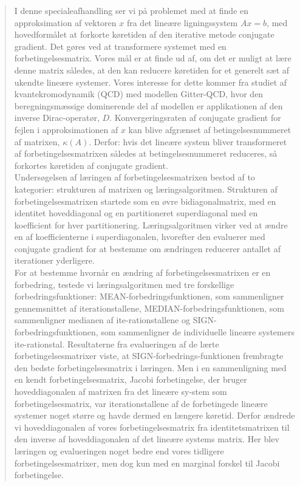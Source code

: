 \clearpage
\thispagestyle{empty}
\begin{abstract}
I denne specialeafhandling ser vi på problemet med at finde en approksimation af vektoren \(x\) fra det lineære ligningssystem \(Ax=b\), med hovedformålet at forkorte køretiden af den iterative metode conjugate gradient. Det gøres ved at transformere systemet med en forbetingelsesmatrix. Vores mål er at finde ud af, om det er muligt at lære denne matrix således, at den kan reducere køretiden for et generelt sæt af ukendte lineære systemer. Vores interesse for dette kommer fra studiet af kvantekromodynamik (QCD) med modellen Gitter-QCD, hvor den beregningsmæssige dominerende del af modellen er applikationen af den inverse Dirac-operatør, \(D\). Konvergeringsraten af conjugate gradient for fejlen i approksimationen af \(x\) kan blive afgrænset af betingelsesnummeret af matrixen, \(\kappa(A)\). Derfor: hvis det lineære system bliver transformeret af forbetingelsesmatrixen således at betingelsesnummeret reduceres, så forkortes køretiden af conjugate gradient.
\\

Undersøgelsen af læringen af forbetingelsesmatrixen bestod af to kategorier: strukturen af matrixen og læringsalgoritmen. Strukturen af forbetingelsesmatrixen startede som en øvre bidiagonalmatrix, med en identitet hoveddiagonal og en partitioneret superdiagonal med en koefficient for hver partitionering. Læringsalgoritmen virker ved at ændre en af koefficienterne i superdiagonalen, hvorefter den evaluerer med conjugate gradient for at bestemme om ændringen reducerer antallet af iterationer yderligere.
\\

For at bestemme hvornår en ændring af forbetingelsesmatrixen er en forbedring, testede vi læringsalgoritmen med tre forskellige forbedringsfunktioner: MEAN-forbedringsfunktionen, som sammenligner gennemsnittet af iterationstallene, MEDIAN-forbedringsfunktionen, som sammenligner medianen af ite-rationstallene og SIGN-forbedringsfunktionen, som sammenligner de individuelle lineære systemers ite-rationstal. Resultaterne fra evalueringen af de lærte forbetingelsesmatrixer viste, at SIGN-forbedrings-funktionen frembragte den bedste forbetingelsesmatrix i læringen. Men i en sammenligning med en kendt forbetingelsesmatrix, Jacobi forbetingelse, der bruger hoveddiagonalen af matrixen fra det lineære sy-stem som forbetingelsesmatrix, var iterationstallene af de forbetingede lineære systemer noget større og havde dermed en længere køretid. Derfor ændrede vi hoveddiagonalen af vores forbetingelsesmatrix fra identitetsmatrixen til den inverse af hoveddiagonalen af det lineære systems matrix. Her blev læringen og evalueringen noget bedre end vores tidligere forbetingelsesmatrixer, men dog kun med en marginal forskel til Jacobi forbetingelse.
\\


\end{abstract}
